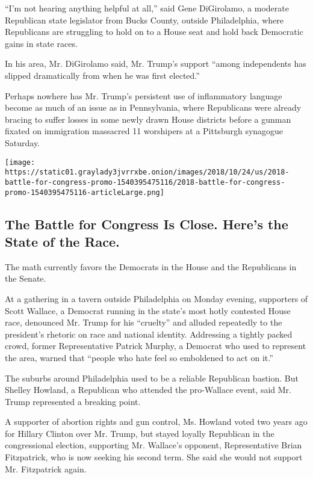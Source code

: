 ``I'm not hearing anything helpful at all,'' said Gene DiGirolamo, a
moderate Republican state legislator from Bucks County, outside
Philadelphia, where Republicans are struggling to hold on to a House
seat and hold back Democratic gains in state races.

In his area, Mr. DiGirolamo said, Mr. Trump's support ``among
independents has slipped dramatically from when he was first elected.''

Perhaps nowhere has Mr. Trump's persistent use of inflammatory language
become as much of an issue as in Pennsylvania, where Republicans were
already bracing to suffer losses in some newly drawn House districts
before a gunman fixated on immigration massacred 11 worshipers at a
Pittsburgh synagogue Saturday.

\href{https://www.nytimes3xbfgragh.onion/interactive/2018/10/24/us/elections/2018-battle-for-congress.html}{}

\texttt{[image: https://static01.graylady3jvrrxbe.onion/images/2018/10/24/us/2018-battle-for-congress-promo-1540395475116/2018-battle-for-congress-promo-1540395475116-articleLarge.png]}

\hypertarget{the-battle-for-congress-is-close-heres-the-state-of-the-race}{%
\subsection{The Battle for Congress Is Close. Here's the State of the
Race.}\label{the-battle-for-congress-is-close-heres-the-state-of-the-race}}

The math currently favors the Democrats in the House and the Republicans
in the Senate.

At a gathering in a tavern outside Philadelphia on Monday evening,
supporters of Scott Wallace, a Democrat running in the state's most
hotly contested House race, denounced Mr. Trump for his ``cruelty'' and
alluded repeatedly to the president's rhetoric on race and national
identity. Addressing a tightly packed crowd, former Representative
Patrick Murphy, a Democrat who used to represent the area, warned that
``people who hate feel so emboldened to act on it.''

The suburbs around Philadelphia used to be a reliable Republican
bastion. But Shelley Howland, a Republican who attended the pro-Wallace
event, said Mr. Trump represented a breaking point.

A supporter of abortion rights and gun control, Ms. Howland voted two
years ago for Hillary Clinton over Mr. Trump, but stayed loyally
Republican in the congressional election, supporting Mr. Wallace's
opponent, Representative Brian Fitzpatrick, who is now seeking his
second term. She said she would not support Mr. Fitzpatrick again.

